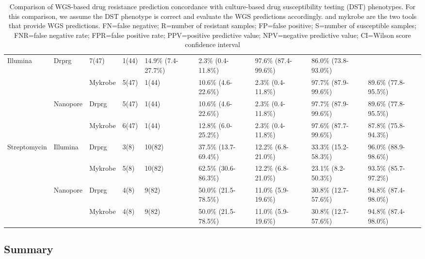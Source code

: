 \begin{table}
{\begin{tabular}{|l|l|l|l|l|l|l|l|l|}
  \multirow{2}{*}{Illumina} &
  Drprg &
  7(47) &
  1(44) &
  14.9\% (7.4-27.7\%) &
  2.3\% (0.4-11.8\%) &
  97.6\% (87.4-99.6\%) &
  86.0\% (73.8-93.0\%) \\ \cline{3-9} 
 &
   &
  Mykrobe &
  5(47) &
  1(44) &
  10.6\% (4.6-22.6\%) &
  2.3\% (0.4-11.8\%) &
  97.7\% (87.9-99.6\%) &
  89.6\% (77.8-95.5\%) \\ \cline{2-9} 
 &
  \multirow{2}{*}{Nanopore} &
  Drprg &
  5(47) &
  1(44) &
  10.6\% (4.6-22.6\%) &
  2.3\% (0.4-11.8\%) &
  97.7\% (87.9-99.6\%) &
  89.6\% (77.8-95.5\%) \\ \cline{3-9} 
 &
   &
  Mykrobe &
  6(47) &
  1(44) &
  12.8\% (6.0-25.2\%) &
  2.3\% (0.4-11.8\%) &
  97.6\% (87.7-99.6\%) &
  87.8\% (75.8-94.3\%) \\ \hline
\multirow{4}{*}{Streptomycin} &
  \multirow{2}{*}{Illumina} &
  Drprg &
  3(8) &
  10(82) &
  37.5\% (13.7-69.4\%) &
  12.2\% (6.8-21.0\%) &
  33.3\% (15.2-58.3\%) &
  96.0\% (88.9-98.6\%) \\ \cline{3-9} 
 &
   &
  Mykrobe &
  5(8) &
  10(82) &
  62.5\% (30.6-86.3\%) &
  12.2\% (6.8-21.0\%) &
  23.1\% (8.2-50.3\%) &
  93.5\% (85.7-97.2\%) \\ \cline{2-9} 
 &
  \multirow{2}{*}{Nanopore} &
  Drprg &
  4(8) &
  9(82) &
  50.0\% (21.5-78.5\%) &
  11.0\% (5.9-19.6\%) &
  30.8\% (12.7-57.6\%) &
  94.8\% (87.4-98.0\%) \\ \cline{3-9} 
 &
   &
  Mykrobe &
  4(8) &
  9(82) &
  50.0\% (21.5-78.5\%) &
  11.0\% (5.9-19.6\%) &
  30.8\% (12.7-57.6\%) &
  94.8\% (87.4-98.0\%) \\ \hline
\end{tabular}%
}
\caption{Comparison of WGS-based drug resistance prediction concordance with culture-based drug susceptibility testing (DST) phenotypes. For this comparison, we assume the DST phenotype is correct and evaluate the WGS predictions accordingly. \drprg{} and mykrobe are the two tools that provide WGS predictions. FN=false negative; R=number of resistant samples; FP=false positive; S=number of susceptible samples; FNR=false negative rate; FPR=false positive rate; PPV=positive predictive value; NPV=negative predictive value; CI=Wilson score confidence interval}
\label{tab:pheno-concordance}
\end{table}

\subsection{Summary}


